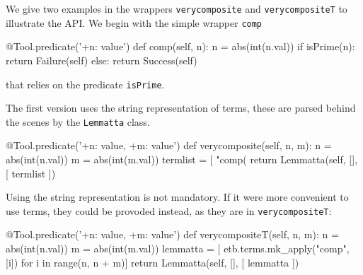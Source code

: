 \documentclass{article}
\begin{document}
We give two examples in the wrappers {\tt verycomposite} and {\tt verycompositeT}
to illustrate the API. We begin with the simple wrapper {\tt comp}

\begin{pythoncode}
@Tool.predicate('+n: value')
 def comp(self, n):
     n = abs(int(n.val))
     if isPrime(n):
         return Failure(self)
     else:
         return Success(self)
\end{pythoncode}

that relies on the predicate {\tt isPrime}. 



The first version uses the string representation of terms, these are parsed behind the scenes 
by the {\tt Lemmatta} class.
\begin{pythoncode}
@Tool.predicate('+n: value, +m: value')
def verycomposite(self, n, m):
    n = abs(int(n.val))
    m = abs(int(m.val))
    termlist = [ "comp(%
    return Lemmatta(self, [{}], [ termlist ])
\end{pythoncode}

Using the string representation is not mandatory. If it were more convenient to use terms,
they could be provoded instead, as they are in {\tt verycompositeT}:

\begin{pythoncode}
@Tool.predicate('+n: value, +m: value')
def verycompositeT(self, n, m):
    n = abs(int(n.val))
    m = abs(int(m.val))
    lemmatta = [ etb.terms.mk_apply("comp", [i])  for i in range(n, n + m)]
    return Lemmatta(self, [{}], [ lemmatta ])
\end{pythoncode}
\end{document}
